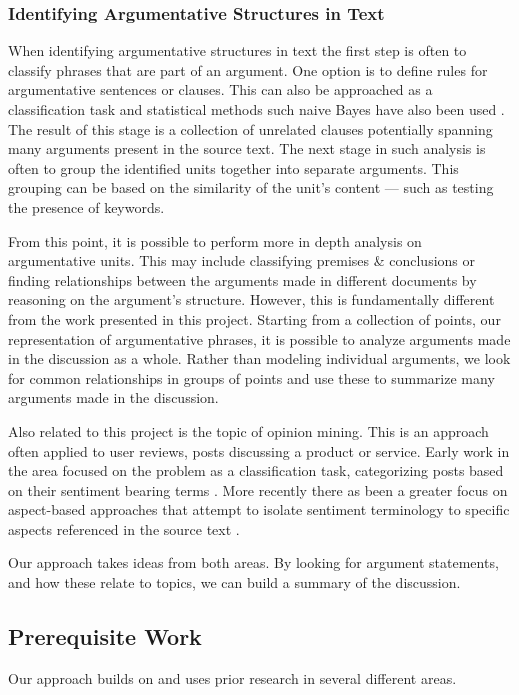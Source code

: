       \tocless\subsubsection{Identifying Argumentative Structures in Text}

        When identifying argumentative structures in text the first step is often to classify phrases that are part of an argument. One option is to define rules for argumentative sentences or clauses. This can also be approached as a classification task and statistical methods such naive Bayes have also been used \cite{palau2009argumentation}. The result of this stage is a collection of unrelated clauses potentially spanning many arguments present in the source text. The next stage in such analysis is often to group the identified units together into separate arguments. This grouping can be based on the similarity of the unit's content --- such as testing the presence of keywords.

        From this point, it is possible to perform more in depth analysis on argumentative units. This may include classifying premises \& conclusions or finding relationships between the arguments made in different documents by reasoning on the argument's structure. However, this is fundamentally different from the work presented in this project. Starting from a collection of points, our representation of argumentative phrases, it is possible to analyze arguments made in the discussion as a whole. Rather than modeling individual arguments, we look for common relationships in groups of points and use these to summarize many arguments made in the discussion.

    Also related to this project is the topic of opinion mining. This is an approach often applied to user reviews, posts discussing a product or service. Early work in the area focused on the problem as a classification task, categorizing posts based on their sentiment bearing terms \cite{turney2002thumbs}. More recently there as been a greater focus on aspect-based approaches that attempt to isolate sentiment terminology to specific aspects referenced in the source text \cite{hu2004mining}.

    Our approach takes ideas from both areas. By looking for argument statements, and how these relate to topics, we can build a summary of the discussion.

    \tocless\subsection{Prerequisite Work}
      Our approach builds on and uses prior research in several different areas.

